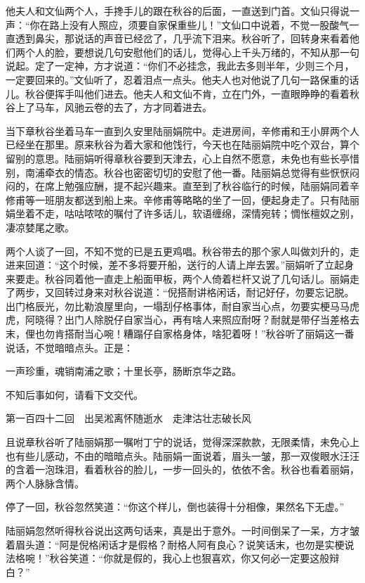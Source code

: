 \documentclass[12pt,UTF8]{ctexbook}
\begin{document}
{{{他夫人和文仙两个人，手搀手儿的跟在秋谷的后面，一直送到门首。文仙只得说一声：“你在路上没有人照应，须要自家保重些儿！”文仙口中说着，不觉一股酸气一直透到鼻尖，那说话的声音已经岔了，几乎流下泪来。秋谷听了，回转身来看着他们两个人的脸，要想说几句安慰他们的话儿，觉得心上千头万绪的，不知从那一句说起。定了一定神，方才说道：“你们不必挂念，我此去多则半年，少则三个月，一定要回来的。”文仙听了，忍着泪点一点头。他夫人也对他说了几句一路保重的话儿。秋谷便挥手叫他们进去。他夫人和文仙不肯，立在门外，一直眼睁睁的看着秋谷上了马车，风驰云卷的去了，方才同着进去。

当下章秋谷坐着马车一直到久安里陆丽娟院中。走进房间，辛修甫和王小屏两个人已经坐在那里。原来秋谷为着大家和他饯行，今天也在陆丽娟院中吃个双台，算个留别的意思。陆丽娟听得章秋谷要到天津去，心上自然不愿意，未免也有些长亭惜别，南浦牵衣的情态。秋谷也密密切切的安慰了他一番。陆丽娟总觉得有些恹恹闷闷的，在席上勉强应酬，提不起兴趣来。直至到了秋谷临行的时候，陆丽娟同着辛修甫等一班朋友都送到船上来。辛修甫等略略的坐了一回，便起身走了。只有陆丽娟坐着不走，咕咕哝哝的嘱付了许多话儿，软语缠绵，深情宛转；惆怅檀奴之别，凄凉婪尾之歌。

两个人谈了一回，不知不觉的已是五更鸡唱。秋谷带去的那个家人叫做刘升的，走进来回道：“这个时候，差不多将要开船，送行的人请上岸去罢。”丽娟听了立起身来要走。秋谷同着他一直走上船面甲板，两个人倚着栏杆又说了几句话儿。丽娟走了两步，又回转过身来对秋谷说道：“倪搭耐讲格闲话，耐记好仔，勿要忘记脱。出门格辰光，勿比勒浪屋里向，一塌刮仔格事体，耐自家当心点，勿要实梗马马虎虎，阿晓得？出门人除脱仔自家当心，再有啥人来照应耐呀？耐就是带仔当差格去末，俚也勿肯搭耐当心啘！糟蹋仔自家格身体，啥犯着呀！”秋谷听了丽娟这一番说话，不觉暗暗点头。正是：

一声珍重，魂销南浦之歌；十里长亭，肠断京华之路。

不知后事如何，请看下文交代。





第一百四十二回　出吴淞离怀随逝水　走津沽壮志破长风





且说章秋谷听了陆丽娟那一嘱咐丁宁的说话，觉得深深款款，无限柔情，未免心上也有些儿感动，不由的暗暗点头。陆丽娟一面说着，眉头一皱，那一双俊眼水汪汪的含着一泡珠泪，看着秋谷的脸儿，一步一回头的，依依不舍。秋谷也看着丽娟，两个人脉脉含情。

停了一回，秋谷忽然笑道：“你这个样儿，倒也装得十分相像，果然名下无虚。”

陆丽娟忽然听得秋谷说出这两句话来，真是出于意外。一时间倒呆了一呆，方才皱着眉头道：“阿是倪格闲话才是假格？耐格人阿有良心？说笑话末，也勿是实梗说法格啘！”秋谷笑道：“你就是假的，我心上也狠喜欢，你又何必一定要这般辩白？”

}}}
\end{document}
